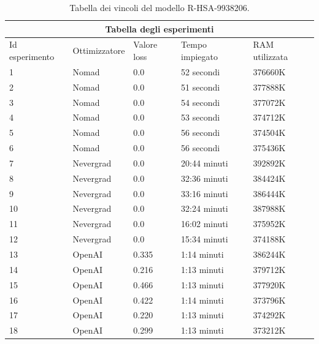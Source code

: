 \begin{table}
\centering
\begin{tabular}{ |p{2cm}||p{2.5cm}|p{2cm}|p{2.1cm}|p{2cm}|  }
 \hline
 \multicolumn{5}{|c|}{Tabella degli esperimenti} \\
 \hline
 Id esperimento&Ottimizzatore&Valore loss  &Tempo impiegato&RAM utilizzata\\
 \hline
    1   &Nomad &0.0    &52 secondi&   376660K\\
     \hline
    2   &Nomad &0.0   &51 secondi&   377888K\\
     \hline
    3   &Nomad &0.0    &54 secondi&   377072K\\
     \hline
    4   &Nomad &0.0    &53 secondi&   374712K\\
     \hline
    5   &Nomad &0.0   &56 secondi&   374504K\\
     \hline
    6   &Nomad &0.0    &56 secondi&   375436K\\
     \hline
    7   &Nevergrad &0.0   &20:44 minuti&   392892K\\
     \hline
    8   &Nevergrad &0.0   &32:36 minuti&   384424K\\
     \hline
    9   &Nevergrad &0.0   &33:16 minuti&   386444K\\
     \hline
    10   &Nevergrad &0.0    &32:24 minuti&   387988K\\
     \hline
    11   &Nevergrad &0.0   &16:02 minuti&   375952K\\
     \hline
    12   &Nevergrad &0.0   &15:34 minuti&   374188K\\
     \hline
    13   &OpenAI &0.335    &1:14 minuti&   386244K\\
     \hline
    14  &OpenAI &0.216    &1:13 minuti&   379712K\\
     \hline
    15  &OpenAI &0.466   &1:13 minuti&   377920K\\
     \hline
    16  &OpenAI &0.422    &1:14 minuti&   373796K\\
     \hline
    17   &OpenAI &0.220   &1:13 minuti&   374292K\\
     \hline
    18   &OpenAI &0.299   &1:13 minuti&   373212K\\
 \hline
\end{tabular}
\caption{Tabella dei vincoli del modello R-HSA-9938206.}
\label{table:esp-R-HSA-9938206}
\end{table}

